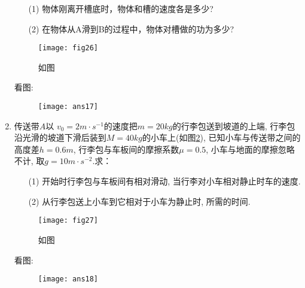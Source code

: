 \begin{enumerate}
\begin{enumerate}
    \item[(1)] 物体刚离开槽底时，物体和槽的速度各是多少?
    \item[(2)] 在物体从A滑到B的过程中，物体对槽做的功为多少?
    \end{enumerate}
        \begin{figure}[ht]
            \centering
            \texttt{[image: fig26]}
                \caption{如图}\label{Fig:26}
        \end{figure}
        \begin{solution}
            看图: 
            \begin{figure}[H]
                \centering
                \texttt{[image: ans17]}
            \end{figure}
        \end{solution}
    \item 传送带$A$以 $v_0=2m\cdot s^{-1}$的速度把$m=20kg$的行李包送到坡道的上端, 行李包沿光滑的坡道下滑后装到$M=40kg$的小车上(如图\ref{Fig:27}), 已知小车与传送带之间的高度差$h=0.6m$,
    行李包与车板间的摩擦系数$\mu =0.5$, 小车与地面的摩擦忽略不计, 取$g=10m\cdot s^{-2}$.求：
    \begin{enumerate}
        \item[(1)] 开始时行李包与车板间有相对滑动, 当行李对小车相对静止时车的速度.
        \item[(2)] 从行李包送上小车到它相对于小车为静止时, 所需的时间.	
    \end{enumerate}
    \begin{figure}[H]
        \centering
        \texttt{[image: fig27]}
            \caption{如图}\label{Fig:27}
    \end{figure}
    \begin{solution}
        看图: 
        \begin{figure}[H]
            \centering
            \texttt{[image: ans18]}
        \end{figure}
    \end{solution}
    
\end{enumerate}